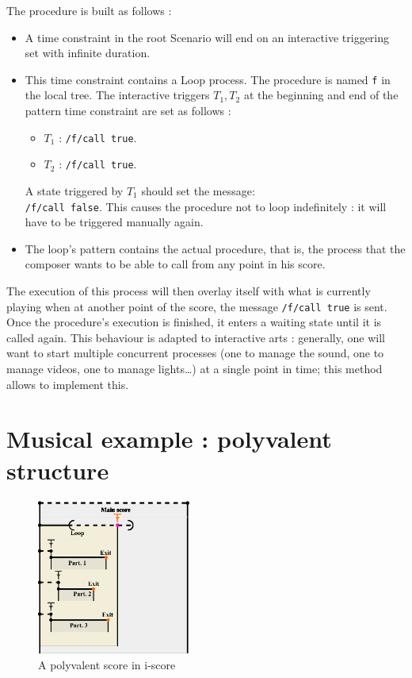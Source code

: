 \documentclass{article}
\begin{document}
The procedure is built as follows : 
\begin{itemize}
    \item A time constraint in the root Scenario will end on an interactive triggering set with infinite duration.
    \item This time constraint contains a Loop process. 
    The procedure is named \lstinline{f} in the local tree. The interactive triggers $T_1, T_2$ at the beginning and end of the pattern time constraint are set as follows : 
    \begin{itemize}
        \item $T_1$ : \lstinline{/f/call true}.
        \item $T_2$ : \lstinline{/f/call true}.
    \end{itemize}
    A state triggered by $T_1$ should set the message:~\\
    \lstinline{/f/call false}. 
    This causes the procedure not to loop 
    indefinitely : it will have to be triggered manually again.
    \item The loop's pattern contains the actual procedure, that is, the process that the composer wants to be able to call from any point in his score. 
\end{itemize}

The execution of this process will then overlay itself with what is currently playing when at another point of the score, 
the message \lstinline{/f/call true} is sent.
Once the procedure's execution is finished, it enters a waiting state until it is called again.
This behaviour is adapted to interactive arts : generally, one will want to start multiple 
concurrent processes (one to manage the sound, one to manage videos, one to manage lights\dots) at a single point in time; this method allows to implement this.

\section{Musical example : polyvalent structure}
\begin{figure}[h]
    \centering
    \includegraphics[width=0.45\textwidth]{images/partition.eps}
    \caption{A polyvalent score in i-score}
    \label{fig.polyvalent}
\end{figure}
\end{document}

